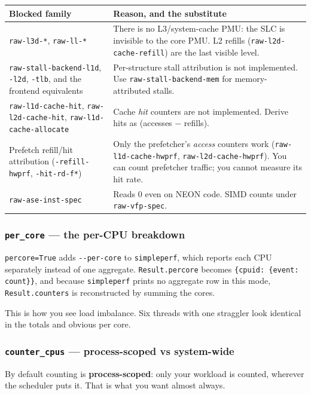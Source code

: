 \documentclass[11pt,a4paper]{article}
\newcommand{\code}[1]{\texttt{\let\_\breakableunderscore #1}}
\newcommand{\breakableunderscore}{\textunderscore\allowbreak}
\begin{document}
\begin{longtable}{@{}p{4.3cm}p{10.4cm}@{}}
\toprule
\textbf{Blocked family} & \textbf{Reason, and the substitute} \\
\midrule
\endhead
\code{raw-l3d-*}, \code{raw-ll-*} & There is no L3/system-cache PMU: the SLC is
  invisible to the core PMU. L2 refills (\code{raw-l2d-cache-refill}) are the
  last visible level. \\
\code{raw-stall-backend-l1d}, \code{-l2d}, \code{-tlb}, and the frontend
  equivalents & Per-structure stall attribution is not implemented. Use
  \code{raw-stall-backend-mem} for memory-attributed stalls. \\
\code{raw-l1d-cache-hit}, \code{raw-l2d-cache-hit}, \code{raw-l1d-cache-allocate}
  & Cache \emph{hit} counters are not implemented. Derive hits as
  (accesses $-$ refills). \\
Prefetch refill/hit attribution (\code{*-refill-hwprf}, \code{*-hit-rd-f*}) &
  Only the prefetcher's \emph{access} counters work
  (\code{raw-l1d-cache-hwprf}, \code{raw-l2d-cache-hwprf}). You can count
  prefetcher traffic; you cannot measure its hit rate. \\
\code{raw-ase-inst-spec} & Reads 0 even on NEON code. SIMD counts under
  \code{raw-vfp-spec}. \\
\bottomrule
\end{longtable}

\subsubsection*{\texttt{per\_core} --- the per-CPU breakdown}

\code{per\_core=True} adds \code{-{}-per-core} to \code{simpleperf}, which
reports each CPU separately instead of one aggregate. \code{Result.per\_core}
becomes \code{\{cpu\_id: \{event: count\}\}}, and because \code{simpleperf}
prints no aggregate row in this mode, \code{Result.counters} is reconstructed by
summing the cores.

This is how you see load imbalance. Six threads with one straggler look
identical in the totals and obvious per core.

\subsubsection*{\texttt{counter\_cpus} --- process-scoped vs system-wide}
\label{sec:countercpus}

By default counting is \textbf{process-scoped}: only your workload is counted,
wherever the scheduler puts it. That is what you want almost always.
\end{document}
